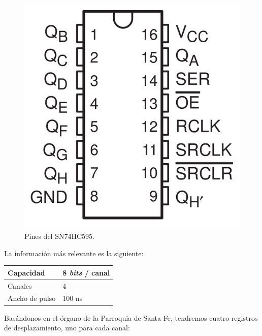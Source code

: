 \begin{figure}[H]
	\noindent \begin{centering}
		\includegraphics[width=\linewidth/4]{capitulo3/SN74HC595}
		\par\end{centering}
	\smallskip
	\caption{\label{fig:SN74HC595} Pines del SN74HC595.}
\end{figure} 

\smallskip

La información más relevante es la siguiente:

\smallskip

\begin{center}
		\begin{tabular}{|l|l|}
		\hline Capacidad & 8 \textit{bits} / canal \\ 
		\hline Canales & 4 \\ 
		\hline Ancho de pulso & 100 ns \\ 
		\hline 
	\end{tabular}
	\smallskip
\end{center}

\smallskip

Basándonos en el órgano de la Parroquia de Santa Fe, tendremos cuatro registros de desplazamiento, uno para cada canal:

